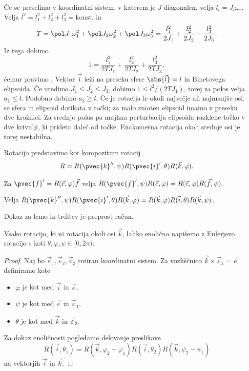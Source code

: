 
Če se preselimo v koordinatni sistem, v katerem je $J$ diagonalen, velja $l_i =
J_i \omega_i$.
Velja $l^2 = l_1^2 + l_2^2 + l_3^2 = \text{konst.}$ in
\[
  T = \pol J_1 \omega_1^2 + \pol J_2 \omega_2^2 + \pol J_3 \omega_3^2
  = \frac{l_1^2}{2 J_1} + \frac{l_2^2}{2 J_2} + \frac{l_3^2}{2 J_3}.
\]
Iz tega dobimo
\[
  1 = \frac{l_1^2}{2 T J_1} + \frac{l_2^2}{2 T J_2} + \frac{l_3^2}{2 T J_3},
\]
čemur pravimo .
Vektor $\vec{l}$ leži na preseku sfere $\abs{\vec{l}} = l$ in Binetovega
elipsoida.
Če uredimo $J_1 \le J_2 \le J_3$, dobimo $1 \le l^2 / (2 T J_1)$, torej za polos
velja $a_1 \le l$.
Podobno dobimo $a_3 \ge l$.
Če je rotacija le okoli največje ali najmanjše osi, se sfera in elipsoid
dotikata v točki; za malo zmoten elipsoid imamo v preseku dve krožnici.
Za srednjo polos pa majhna perturbacija elipsoida razklene točko v dve krivulji,
ki prideta daleč od točke.
Enakomerna rotacija okoli srednje osi je torej nestabilna.



Rotacijo predstavimo kot kompozitum rotacij
\[
  R = R(\pvec{k}'', \psi) R(\pvec{i}', \theta) R(\vec{k}, \varphi).
\]

\begin{lema}
  Za $\pvec{f}' = R(\vec{e}, \varphi) \vec{f}$ velja $R(\pvec{f}', \psi)
  R(\vec{e}, \varphi) = R(\vec{e}, \varphi) R(\vec{f}, \psi)$.
\end{lema}

\begin{trditev}
  Velja $R(\pvec{k}'', \psi) R(\pvec{i}', \theta) R(\vec{k}, \varphi) =
  R(\vec{k}, \varphi) R(\vec{i}, \theta) R(\vec{k}, \psi)$.
\end{trditev}

Dokaz za lemo in trditev je preprost račun.

\begin{trditev}
  Vsako rotacijo, ki ni rotacija okoli osi $\vec{k}$, lahko enolično napišemo z
  Eulerjevo rotacijo s koti $\theta, \varphi, \psi \in [0, 2 \pi)$.
\end{trditev}

\begin{proof}
  Naj bo $\vec{\varepsilon}_1, \vec{\varepsilon}_2, \vec{\varepsilon}_3$ rotiran
  koordinatni sistem.
  Za vozliščnico $\vec{k} \times \vec{\varepsilon}_3 = \vec{e}$ definiramo kote
  \begin{itemize}
  \item $\varphi$ je kot med $\vec{i}$ in $\vec{e}$,
  \item $\psi$ je kot med $\vec{e}$ in $\vec{\varepsilon}_1$,
  \item $\theta$ je kot med $\vec{k}$ in $\vec{\varepsilon}_3$.
  \end{itemize}
  Za dokaz enoličnosti pogledamo delovanje preslikave
  \[
	R(\vec{i}, \theta_1) = R(\vec{k}, \varphi_2 - \varphi_1) R(\vec{i},
	\theta_2) R(\vec{k}, \psi_2 - \psi_1)
  \]
  na vektorjih $\vec{i}$ in $\vec{k}$.
\end{proof}

